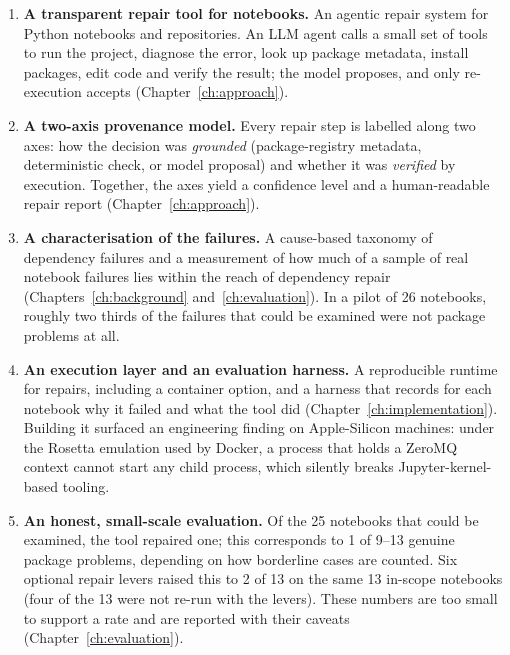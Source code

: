 \begin{enumerate}
  \item \textbf{A transparent repair tool for notebooks.} An agentic repair system for Python notebooks and repositories. An \ac{LLM} agent calls a small set of tools to run the project, diagnose the error, look up package metadata, install packages, edit code and verify the result; the model proposes, and only re-execution accepts (Chapter~\ref{ch:approach}).
  \item \textbf{A two-axis provenance model.} Every repair step is labelled along two axes: how the decision was \emph{grounded} (package-registry metadata, deterministic check, or model proposal) and whether it was \emph{verified} by execution. Together, the axes yield a confidence level and a human-readable repair report (Chapter~\ref{ch:approach}).
  \item \textbf{A characterisation of the failures.} A cause-based taxonomy of dependency failures and a measurement of how much of a sample of real notebook failures lies within the reach of dependency repair (Chapters~\ref{ch:background} and~\ref{ch:evaluation}). In a pilot of 26 notebooks, roughly two thirds of the failures that could be examined were not package problems at all.
  \item \textbf{An execution layer and an evaluation harness.} A reproducible runtime for repairs, including a container option, and a harness that records for each notebook why it failed and what the tool did (Chapter~\ref{ch:implementation}). Building it surfaced an engineering finding on Apple-Silicon machines: under the Rosetta emulation used by Docker, a process that holds a ZeroMQ context cannot start any child process, which silently breaks Jupyter-kernel-based tooling.
  \item \textbf{An honest, small-scale evaluation.} Of the 25 notebooks that could be examined, the tool repaired one; this corresponds to 1 of 9--13 genuine package problems, depending on how borderline cases are counted. Six optional repair levers raised this to 2 of 13 on the same 13 in-scope notebooks (four of the 13 were not re-run with the levers). These numbers are too small to support a rate and are reported with their caveats (Chapter~\ref{ch:evaluation}).
\end{enumerate}

